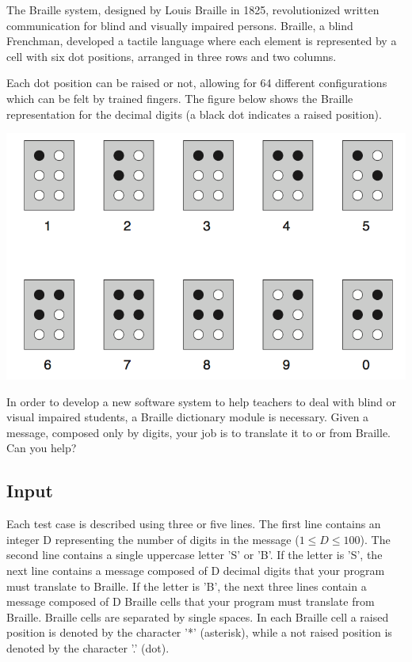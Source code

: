 The Braille system, designed by Louis Braille in 1825, revolutionized
written communication for blind and visually impaired persons. Braille, a
blind Frenchman, developed a tactile language where each element is
represented by a cell with six dot positions, arranged in three rows and two
columns.

Each dot position can be raised or not, allowing for 64 different
configurations which can be felt by trained fingers. The figure below shows
the Braille representation for the decimal digits (a black dot indicates a
raised position).

\begin{center}
\includegraphics[scale=0.4]{problems/inbraille/imagens/braille.png}
\end{center}

In order to develop a new software system to help teachers to deal with
blind or visual impaired students, a Braille dictionary module is necessary.
Given a message, composed only by digits, your job is to translate it to or
from Braille. Can you help?

\subsection*{Input}
Each test case is described using three or five lines. The first line
contains an integer D representing the number of digits in the message ($1
\le D \le 100$). The second line contains a single uppercase letter 'S' or
'B'. If the letter is 'S', the next line contains a message composed of D
decimal digits that your program must translate to Braille. If the letter is
'B', the next three lines contain a message composed of D Braille cells that
your program must translate from Braille. Braille cells are separated by
single spaces. In each Braille cell a raised position is denoted by the
character '*' (asterisk), while a not raised position is denoted by the
character '.' (dot).

